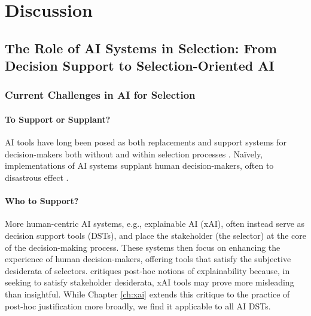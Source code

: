 \chapter{\label{ch:discussion}Discussion}

\minitoc 

\section[The Role of AI Systems in Selection]{The Role of AI Systems in Selection: From Decision Support to Selection-Oriented AI}
\subsection{Current Challenges in AI for Selection}
\subsubsection{To Support or Supplant?}
AI tools have long been posed as both replacements and support systems for decision-makers both without and within selection processes \cite{barocas_big_2016,jacobs_how_2021,hildebrandt_law_nodate,yarger2020algorithmic,mattu_how_nodate}. Naïvely, implementations of AI systems supplant human decision-makers, often to disastrous effect \cite{mattu_how_nodate}.

\subsubsection{Who to Support?}
More human-centric AI systems, e.g., explainable AI (xAI), often instead serve as decision support tools (DSTs), and place the stakeholder (the selector) at the core of the decision-making process. These systems then focus on enhancing the experience of human decision-makers, offering tools that satisfy the subjective desiderata of selectors. \textcite{Lipton} critiques post-hoc notions of explainability because, in seeking to satisfy stakeholder desiderata, xAI tools may prove more misleading than insightful. While Chapter \ref{ch:xai} extends this critique to the practice of post-hoc justification more broadly, we find it applicable to all AI DSTs.

